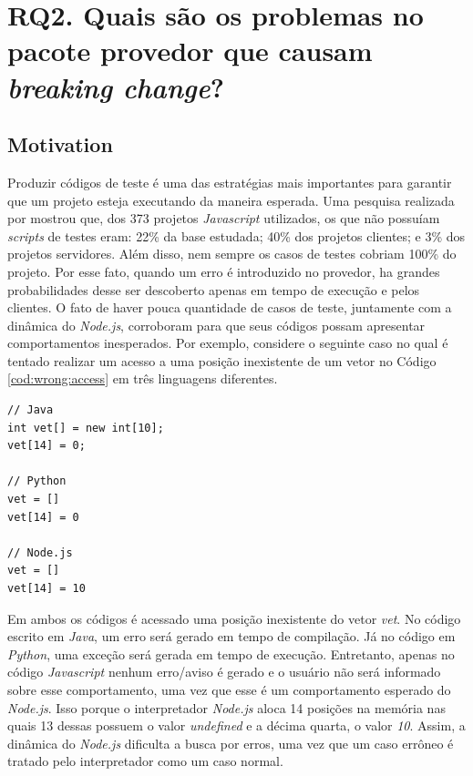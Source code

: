 \section{RQ2. Quais são os problemas no pacote provedor que causam \textit{breaking change}?}
\label{sec:rq2}

\subsection{Motivation}
\label{mot:rq2}

Produzir códigos de teste é uma das estratégias mais importantes para garantir que um projeto esteja executando da maneira esperada. Uma pesquisa realizada por  mostrou que, dos 373 projetos \textit{Javascript} utilizados, os que não possuíam \textit{scripts} de testes eram: 22\% da base estudada; 40\% dos projetos clientes; e 3\% dos projetos servidores. Além disso, nem sempre os casos de testes cobriam 100\% do projeto. Por esse fato, quando um erro é introduzido no provedor, ha grandes probabilidades desse ser descoberto apenas em tempo de execução e pelos clientes. O fato de haver pouca quantidade de casos de teste, juntamente com a dinâmica do \textit{Node.js}, corroboram para que seus códigos possam apresentar comportamentos inesperados. Por exemplo, considere o seguinte caso no qual é tentado realizar um acesso a uma posição inexistente de um vetor no Código \ref{cod:wrong:access} em três linguagens diferentes.

\begin{lstlisting}[style=javascript, label=cod:wrong:access, caption={Acesso inválido à posição de memória}, numbers=none]
// Java
int vet[] = new int[10];
vet[14] = 0;

// Python
vet = []
vet[14] = 0

// Node.js
vet = []
vet[14] = 10
\end{lstlisting}

Em ambos os códigos é acessado uma posição inexistente do vetor \textit{vet}. No código escrito em \textit{Java}, um erro será gerado em tempo de compilação. Já no código em \textit{Python}, uma exceção será gerada em tempo de execução. Entretanto, apenas no código \textit{Javascript} nenhum erro/aviso é gerado e o usuário não será informado sobre esse comportamento, uma vez que esse é um comportamento esperado do \textit{Node.js}. Isso porque o interpretador \textit{Node.js} aloca 14 posições na memória nas quais 13 dessas possuem o valor \textit{undefined} e a décima quarta, o valor \textit{10}. Assim, a dinâmica do \textit{Node.js} dificulta a busca por erros, uma vez que um caso errôneo é tratado pelo interpretador como um caso normal.

